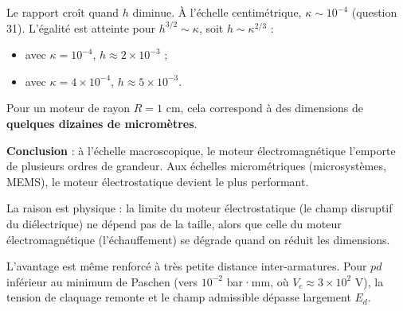 \documentclass[11pt,a4paper]{article}
\providecommand{\tightlist}{\setlength{\itemsep}{0pt}\setlength{\parskip}{0pt}}
\newcommand{\equationajustee}[1]{%
  \sbox{\boiteequation}{$\displaystyle #1$}%
  \ifdim\wd\boiteequation>\linewidth
    \[\resizebox{\linewidth}{!}{\usebox{\boiteequation}}\]%
  \else
    \[#1\]%
  \fi}
\begin{document}
\equationajustee{\boxed{\frac{\langle\mathcal P_{\text{m,el}}\rangle}{\langle\mathcal P_{\text{m,ma}}\rangle}\sim h^{-3/2}}}
Le rapport croît quand \(h\) diminue. À l'échelle centimétrique, \(\kappa\sim10^{-4}\) (question 31). L'égalité est atteinte pour \(h^{3/2}\sim\kappa\), soit \(h\sim\kappa^{2/3}\) :

\begin{itemize}
\tightlist
\item
  avec \(\kappa=10^{-4}\), \(h\approx2\times10^{-3}\) ;
\item
  avec \(\kappa=4\times10^{-4}\), \(h\approx5\times10^{-3}\).
\end{itemize}

Pour un moteur de rayon \(R=1\) cm, cela correspond à des dimensions de \textbf{quelques dizaines de micromètres}.

\textbf{Conclusion} : à l'échelle macroscopique, le moteur électromagnétique l'emporte de plusieurs ordres de grandeur. Aux échelles micrométriques (microsystèmes, MEMS), le moteur électrostatique devient le plus performant.

La raison est physique : la limite du moteur électrostatique (le champ disruptif du diélectrique) ne dépend pas de la taille, alors que celle du moteur électromagnétique (l'échauffement) se dégrade quand on réduit les dimensions.

L'avantage est même renforcé à très petite distance inter-armatures. Pour \(pd\) inférieur au minimum de Paschen (vers \(10^{-2}\) bar·mm, où \(V_c\approx3\times10^{2}\) V), la tension de claquage remonte et le champ admissible dépasse largement \(E_d\).
\end{document}
